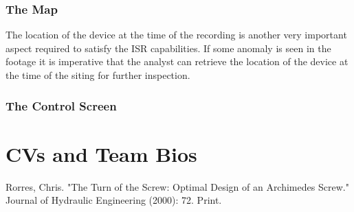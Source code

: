 \documentclass{report}
\begin{document}
\subsubsection{The Map}
The location of the device at the time of the recording is another very important aspect required to satisfy the ISR capabilities. If some anomaly is seen in the footage it is imperative that the analyst can retrieve the location of the device at the time of the siting for further inspection.
\subsubsection{The Control Screen}

\section{CVs and Team Bios}
\begin{thebibliography}{9}
Rorres, Chris. "The Turn of the Screw: Optimal Design of an Archimedes Screw." Journal of Hydraulic Engineering (2000): 72. Print.
\end{thebibliography}
\end{document}
